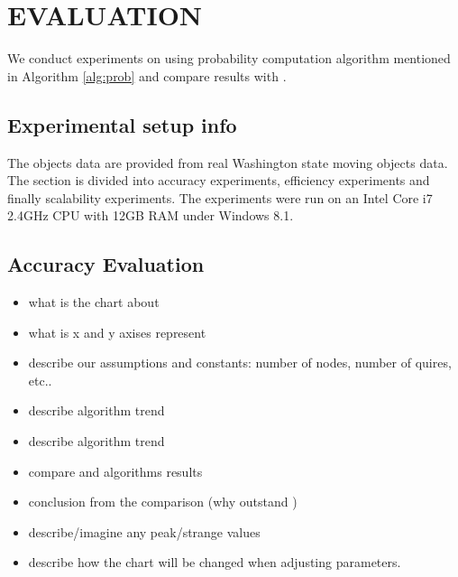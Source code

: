 \chapter{EVALUATION}
\label{sect:evaluation}
We conduct experiments on \pf using probability computation algorithm mentioned in Algorithm \ref{alg:prob} and compare results with \TPR.
\section{Experimental setup info}
The objects data are provided from real Washington state moving objects data. The section is divided into accuracy experiments, efficiency experiments and finally scalability experiments. The experiments were run on an Intel Core i7 2.4GHz CPU with 12GB RAM under Windows 8.1.
\section{Accuracy Evaluation}
\begin{itemize}
\item what is the chart about
\item what is x and y axises represent
\item describe our assumptions and constants: number of nodes, number of quires, etc..
\item describe \pf algorithm trend
\item describe \tpr algorithm trend
\item compare \pf and \tpr algorithms results
\item conclusion from the comparison (why \pf outstand \tpr)
\item describe/imagine any peak/strange values
\item describe how the chart will be changed when adjusting parameters.
\end{itemize}


